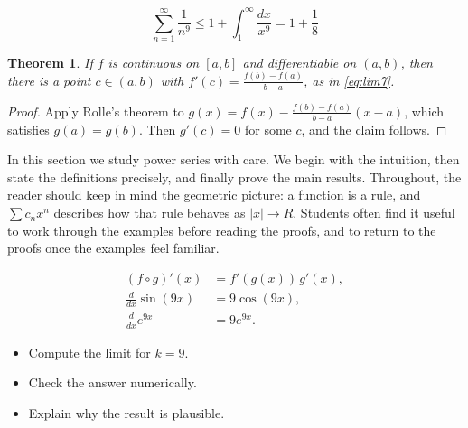 \documentclass[11pt]{article}
\newtheorem{theorem}{Theorem}[section]
\begin{document}
\[
  \sum_{n=1}^{\infty} \frac{1}{n^{9}} \le 1 + \int_1^{\infty} \frac{dx}{x^{9}} = 1 + \frac{1}{8}
\]

\begin{theorem}
If $f$ is continuous on $[a,b]$ and differentiable on $(a,b)$, then there is a point $c \in (a,b)$ with $f'(c) = \frac{f(b)-f(a)}{b-a}$, as in \eqref{eq:lim7}.
\end{theorem}

\begin{proof}
Apply Rolle's theorem to $g(x) = f(x) - \frac{f(b)-f(a)}{b-a}(x-a)$, which satisfies $g(a) = g(b)$. Then $g'(c) = 0$ for some $c$, and the claim follows.
\end{proof}

In this section we study power series with care. We begin with the intuition, then state the definitions precisely, and finally prove the main results. Throughout, the reader should keep in mind the geometric picture: a function is a rule, and $\sum c_n x^n$ describes how that rule behaves as $|x| \to R$. Students often find it useful to work through the examples before reading the proofs, and to return to the proofs once the examples feel familiar. 

\begin{align*}
  (f \circ g)'(x) &= f'(g(x))\, g'(x), \\
  \frac{d}{dx} \sin(9 x) &= 9 \cos(9 x), \\
  \frac{d}{dx} e^{9 x} &= 9 e^{9 x}.
\end{align*}

\begin{itemize}
  \item Compute the limit for $k = 9$.
  \item Check the answer numerically.
  \item Explain why the result is plausible.
\end{itemize}
\end{document}
